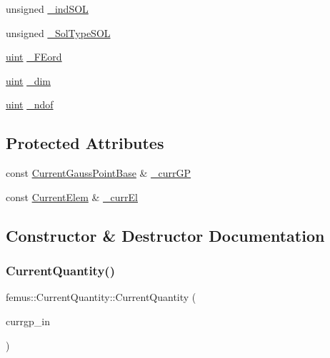 \begin{DoxyCompactItemize}
\item 
unsigned \mbox{\hyperlink{classfemus_1_1_current_quantity_a73b203a21dbae8730772231744480e31}{\+\_\+ind\+S\+OL}}
\item 
unsigned \mbox{\hyperlink{classfemus_1_1_current_quantity_adba03b170d7cf82cf627d460d49fc2ee}{\+\_\+\+Sol\+Type\+S\+OL}}
\item 
\mbox{\hyperlink{_typedefs_8hpp_a91ad9478d81a7aaf2593e8d9c3d06a14}{uint}} \mbox{\hyperlink{classfemus_1_1_current_quantity_acad33c2cbe7c142f4140bb12fb435cd4}{\+\_\+\+F\+Eord}}
\item 
\mbox{\hyperlink{_typedefs_8hpp_a91ad9478d81a7aaf2593e8d9c3d06a14}{uint}} \mbox{\hyperlink{classfemus_1_1_current_quantity_aaeb57cb481fb71eda9c01f8b9b373f75}{\+\_\+dim}}
\item 
\mbox{\hyperlink{_typedefs_8hpp_a91ad9478d81a7aaf2593e8d9c3d06a14}{uint}} \mbox{\hyperlink{classfemus_1_1_current_quantity_afe410f6f270e6cdb4ce5322ace39eff8}{\+\_\+ndof}}
\end{DoxyCompactItemize}
\subsection*{Protected Attributes}
\begin{DoxyCompactItemize}
\item 
const \mbox{\hyperlink{classfemus_1_1_current_gauss_point_base}{Current\+Gauss\+Point\+Base}} \& \mbox{\hyperlink{classfemus_1_1_current_quantity_a99f7729207c7e6ee5f0e94d7f8862ffd}{\+\_\+curr\+GP}}
\item 
const \mbox{\hyperlink{classfemus_1_1_current_elem}{Current\+Elem}} \& \mbox{\hyperlink{classfemus_1_1_current_quantity_acb49f7240d66144048cc915f615d1cda}{\+\_\+curr\+El}}
\end{DoxyCompactItemize}


\subsection{Constructor \& Destructor Documentation}
\mbox{\label{classfemus_1_1_current_quantity_a33a90d4e1c9e39be4ca7400ce36a5c53}} 
\subsubsection{\texorpdfstring{Current\+Quantity()}{CurrentQuantity()}}
{\footnotesize\ttfamily femus\+::\+Current\+Quantity\+::\+Current\+Quantity (\begin{DoxyParamCaption}\item[{const \mbox{\hyperlink{classfemus_1_1_current_gauss_point_base}{Current\+Gauss\+Point\+Base}} \&}]{currgp\+\_\+in }\end{DoxyParamCaption})}



